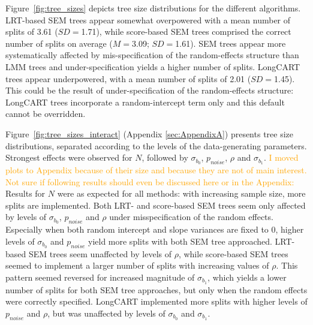 \documentclass[doc,floatsintext,natbib]{apa7}
\begin{document}
Figure~\ref{fig:tree_sizes} depicts tree size distributions for the different algorithms. LRT-based SEM trees appear somewhat overpowered with a mean number of splits of 3.61 ($SD = $1.71), while score-based SEM trees comprised the correct number of splits on average ($M = $3.09; $SD = $1.61). SEM trees appear more systematically affected by mis-specification of the random-effects structure than LMM trees and under-specification yields a higher number of splits. LongCART trees appear underpowered, with a mean number of splits of 2.01 ($SD = $1.45). This could be the result of under-specification of the random-effects structure: LongCART trees incorporate a random-intercept term only and this default cannot be overridden.




Figure~\ref{fig:tree_sizes_interact} (Appendix \ref{sec:AppendixA}) presents tree size distributions, separated according to the levels of the data-generating parameters. Strongest effects were observed for $N$, followed by $\sigma_{b_0}$, $p_{noise}$, $\rho$ and $\sigma_{b_1}$. \textcolor{orange}{I moved plots to Appendix because of their size and because they are not of main interest. Not sure if following results should even be discussed here or in the Appendix:} Results for $N$ were as expected for all methods: with increasing sample size, more splits are implemented. Both LRT- and score-based SEM trees seem only affected by levels of $\sigma_{b_0}$, $p_{noise}$ and $\rho$ under misspecification of the random effects. Especially when both random intercept and slope variances are fixed to 0, higher levels of $\sigma_{b_0}$ and $p_{noise}$ yield more splits with both SEM tree approached. LRT-based SEM trees seem unaffected by levels of $\rho$, while score-based SEM trees seemed to implement a larger number of splits with increasing values of $\rho$. This pattern seemed reversed for increased magnitude of $\sigma_{b_1}$, which yields a lower number of splits for both SEM tree approaches, but only when the random effects were correctly specified. LongCART implemented more splits with higher levels of $p_{noise}$ and $\rho$, but was unaffected by levels of $\sigma_{b_0}$ and $\sigma_{b_1}$.
\end{document}
